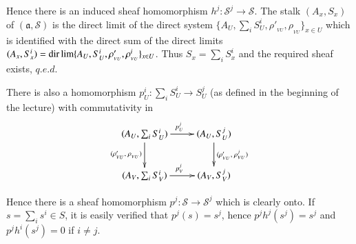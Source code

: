 Hence there is an induced sheaf homomorphism $h^j: \mathscr{S}^j \to
\mathscr{S}$. The stalk $(A_x,S_x)$ of $(\mathfrak{a},\mathscr{S})$ is the direct
limit of the direct system \break $\{ A_U, \sum_i S^i_U, \rho'_{_{VU}},
\rho_{_{VU}} \}_{x \in U}$ which is identified with the direct sum of the
direct limits $(A_x,S^i_x)= {\rm dir} \lim \{ A_U,S^i_U,\rho'_{_{VU}}, \rho^i_{_{VU}}
\}_{x \in U}$. Thus $S_x=\sum_i S^i_x$ and the required sheaf exists,
$q.e.d$. 

There is also a homomorphism $p^i_U: \sum_i S^i_U\to S^j_U$ (as
defined in the beginning of the lecture) with commutativity in 
\[
\xymatrix{
(A_U, \sum_i S^i_U) \ar[r]^{p^j_U}\ar[d]_{(\rho'_{_{VU}}, \; \rho_{_{VU}})} & (A_U,
  S^j_U) \ar[d]^{(\rho'_{_{VU}}, \; \rho^j_{_{VU}})}\\
(A_V,\sum_iS^i_V) \ar[r]^{p^j_V} & (A_V,  S^j_V)
}
\]

Hence there is a sheaf homomorphism $p^j:\mathscr{S}\to \mathscr{S}^j$
which is clearly onto. If $s=\sum_i s^i \in S$, it is easily verified
that $p^j(s)=s^j$, hence $p^jh^j(s^j)=s^j$ and $p^j h^i(s^j)=0$ if $i
\neq j$. 


